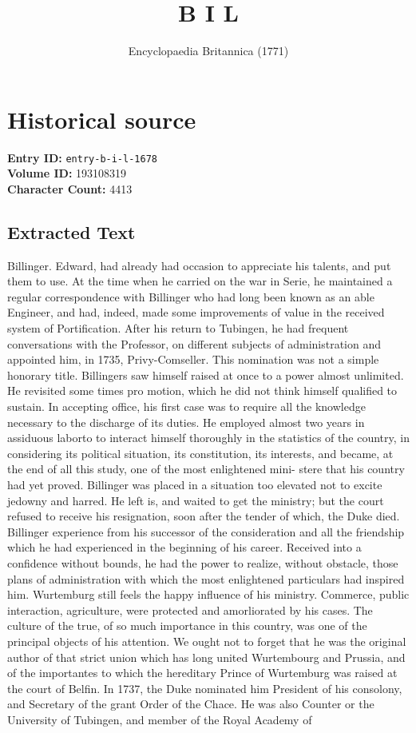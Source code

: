 \documentclass{article}
\title{B I L}
\date{Encyclopaedia Britannica (1771)}
\begin{document}
\maketitle

\section*{Historical source}
\textbf{Entry ID:} \texttt{entry-b-i-l-1678} \\
\textbf{Volume ID:} 193108319 \\
\textbf{Character Count:} 4413

\subsection*{Extracted Text}
Billinger. Edward, had already had occasion to appreciate his talents, and put them to use. At the time when he carried on the war in Serie, he maintained a regular correspondence with Billinger who had long been known as an able Engineer, and had, indeed, made some improvements of value in the received system of Portification. After his return to Tubingen, he had frequent conversations with the Professor, on different subjects of administration and appointed him, in 1735, Privy-Comseller. This nomination was not a simple honorary title. Billingers saw himself raised at once to a power almost unlimited. He revisited some times pro motion, which he did not think himself qualified to sustain. In accepting office, his first case was to require all the knowledge necessary to the discharge of its duties. He employed almost two years in assiduous laborto to interact himself thoroughly in the statistics of the country, in considering its political situation, its constitution, its interests, and became, at the end of all this study, one of the most enlightened mini- stere that his country had yet proved. Billinger was placed in a situation too elevated not to excite jedowny and harred. He left is, and waited to get the ministry; but the court refused to receive his resignation, soon after the tender of which, the Duke died. Billinger experience from his successor of the consideration and all the friendship which he had experienced in the beginning of his career. Received into a confidence without bounds, he had the power to realize, without obstacle, those plans of administration with which the most enlightened particulars had inspired him. Wurtemburg still feels the happy influence of his ministry. Commerce, public interaction, agriculture, were protected and amorliorated by his cases. The culture of the true, of so much importance in this country, was one of the principal objects of his attention. We ought not to forget that he was the original author of that strict union which has long united Wurtembourg and Prussia, and of the importantes to which the hereditary Prince of Wurtemburg was raised at the court of Belfin. In 1737, the Duke nominated him President of his consolony, and Secretary of the grant Order of the Chace. He was also Counter or the University of Tubingen, and member of the Royal Academy of
\end{document}
